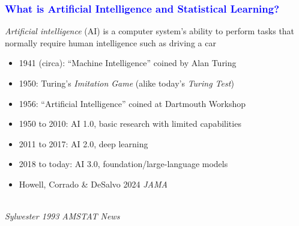 \documentclass[11pt,dvipsnames,usenames,times]{beamer}
\begin{document}
\begin{frame}[fragile]
\frametitle{\bf\textcolor{blue}{What is Artificial Intelligence and Statistical Learning?}}
\boldmath
{\it Artificial intelligence} (AI) is a computer system's ability to
  perform tasks that normally require human intelligence such as
  driving a car 
\begin{itemize}
\item 1941 (circa): ``Machine Intelligence'' coined by Alan Turing
\item 1950: Turing's {\it Imitation Game} (alike today's {\it Turing Test})
\begin{comment}
For example, player A is a computer pretending to be a man, player B is a woman and player C (who plays the role of the interrogator) can be either. In the Imitation Game, player C is unable to see either player A or player B (and knows them only as X and Y), and can communicate with them only through written notes or any other form that does not give away any details about their gender. By asking questions of player A and player B, player C tries to determine which of the two is the man and which is the woman. Player A's role is to trick the interrogator into making the wrong decision, while player B attempts to assist the interrogator in making the right one
\end{comment}
\item 1956: ``Artificial Intelligence'' coined at Dartmouth Workshop
\item 1950 to 2010: AI 1.0, basic research with limited capabilities
\item 2011 to 2017: AI 2.0, deep learning
\item 2018 to today: AI 3.0, foundation/large-language models
\item Howell, Corrado \& DeSalvo 2024 {\it JAMA}
\end{itemize}
\begin{center}
\\
{\it Sylwester 1993 AMSTAT News}
\end{center}
\end{frame}
\end{document}
